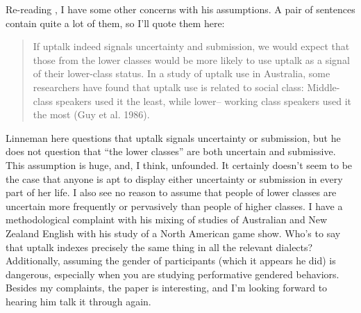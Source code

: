\documentclass[man,12pt,natbib]{apa6}
\begin{document}
Re-reading \citet{Linneman13}, I have some other concerns with his assumptions.
A pair of sentences contain quite a lot of them, so I'll quote them here:
\begin{quote}
	If uptalk indeed signals uncertainty and submission, we would expect that
	those from the lower classes would be more likely to use uptalk as a signal
	of their lower-class status. In a study of uptalk use in Australia, some
	researchers have found that uptalk use is related to social class:
	Middle-class speakers used it the least, while lower– working class
	speakers used it the most (Guy et al. 1986).  \citep[p.~86]{Linneman13}
\end{quote}
Linneman here questions that uptalk signals uncertainty or submission, but he
does not question that ``the lower classes'' are both uncertain and submissive.
This assumption is huge, and, I think, unfounded. It certainly doesn't seem to
be the case that anyone is apt to display either uncertainty or submission in
every part of her life. I also see no reason to assume that people of lower
classes are uncertain more frequently or pervasively than people of higher
classes. I have a methodological complaint with his mixing of studies of
Australian and New Zealand English with his study of a North American game
show. 
Who's to say that uptalk indexes precisely the same thing in all the relevant
dialects? Additionally, assuming the gender of participants (which it appears
he did) is dangerous, especially when you are studying performative gendered
behaviors. Besides my complaints, the paper is interesting, and I'm looking
forward to hearing him talk it through again.

\clearpage

\end{document}
